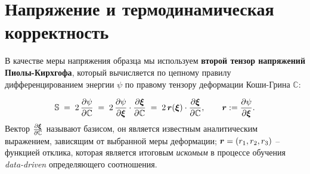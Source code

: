 \section{Напряжение и термодинамическая корректность}

В качестве меры напряжения образца мы используем \textbf{второй тензор напряжений Пиолы-Кирхгофа}, который вычисляется по цепному правилу дифференцированием энергии \(\psi\) 
по правому тензору деформации Коши-Грина \(\mathbb C\):

\begin{equation}
  \mathbb{S} \;=\; 2\,\frac{\partial \psi}{\partial \mathbb{C}}
  \;=\; 2\,\frac{\partial \psi}{\partial \boldsymbol{\xi}} \cdot \frac{\partial \boldsymbol{\xi}}{\partial \mathbb{C}}
  \;=\; 2\,\boldsymbol{r}(\boldsymbol{\xi})\cdot\frac{\partial \boldsymbol{\xi}}{\partial \mathbb{C}},
  \qquad \boldsymbol{r}:=\frac{\partial \psi}{\partial \boldsymbol{\xi}}.
  \label{eq:chain-rule}
\end{equation}
Вектор $\frac{\partial \boldsymbol{\xi}}{\partial \mathbb{C}}$ называют базисом, он является известным аналитическим выражением, зависящим от выбранной меры деформации; $\boldsymbol{r} = (r_1, r_2, r_3)$ -- функцией отклика, которая является итоговым \textit{искомым} в процессе обучения \textit{data-driven} определяющего соотношения.   

